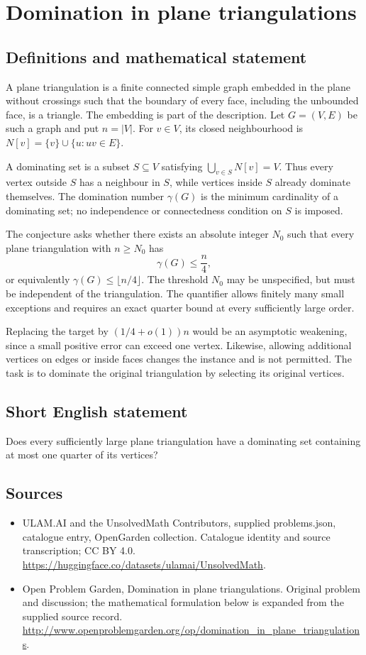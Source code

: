 \documentclass[11pt,a4paper]{article}
\begin{document}
\section*{Domination in plane triangulations}\label{statement}

\subsection{Definitions and mathematical statement}
A plane triangulation is a finite connected simple graph embedded in
the plane without crossings such that the boundary of every face,
including the unbounded face, is a triangle. The embedding is part
of the description. Let $G=(V,E)$ be such a graph and put $n=|V|$.
For $v\in V$, its closed neighbourhood is
$N[v]=\{v\}\cup\{u:uv\in E\}$.

A dominating set is a subset $S\subseteq V$ satisfying
$\bigcup_{v\in S}N[v]=V$. Thus every vertex outside $S$ has a neighbour
in $S$, while vertices inside $S$ already dominate themselves.
The domination number $\gamma(G)$ is the minimum cardinality of a
dominating set; no independence or connectedness condition on $S$
is imposed.

The conjecture asks whether there exists an absolute integer $N_0$
such that every plane triangulation with $n\ge N_0$ has
\[
                             \gamma(G)\le\frac n4,
\]
or equivalently $\gamma(G)\le\lfloor n/4\rfloor$. The threshold $N_0$
may be unspecified, but must be independent of the triangulation.
The quantifier allows finitely many small exceptions and requires an
exact quarter bound at every sufficiently large order.

Replacing the target by $(1/4+o(1))n$ would be an asymptotic weakening,
since a small positive error can exceed one vertex. Likewise,
allowing additional vertices on edges or inside faces changes the
instance and is not permitted. The task is to dominate the original
triangulation by selecting its original vertices.
\subsection{Short English statement}
Does every sufficiently large plane triangulation have a dominating set containing at most one quarter of its vertices?
\subsection{Sources}
\begin{itemize}
\item[S1] ULAM.AI and the UnsolvedMath Contributors, supplied problems.json, catalogue entry, OpenGarden collection. Catalogue identity and source transcription; CC BY 4.0.
\url{https://huggingface.co/datasets/ulamai/UnsolvedMath}.
\item[S2] Open Problem Garden, Domination in plane triangulations. Original problem and discussion; the mathematical formulation below is expanded from the supplied source record.
\url{http://www.openproblemgarden.org/op/domination_in_plane_triangulations}.
\end{itemize}
\end{document}
